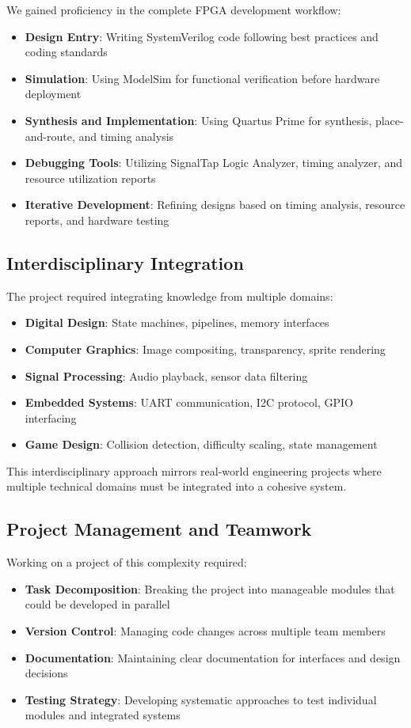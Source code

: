 \documentclass[12pt,a4paper]{article}
\begin{document}
We gained proficiency in the complete FPGA development workflow:
\begin{itemize}
    \item \textbf{Design Entry}: Writing SystemVerilog code following best practices and coding standards
    \item \textbf{Simulation}: Using ModelSim for functional verification before hardware deployment
    \item \textbf{Synthesis and Implementation}: Using Quartus Prime for synthesis, place-and-route, and timing analysis
    \item \textbf{Debugging Tools}: Utilizing SignalTap Logic Analyzer, timing analyzer, and resource utilization reports
    \item \textbf{Iterative Development}: Refining designs based on timing analysis, resource reports, and hardware testing
\end{itemize}

\subsection{Interdisciplinary Integration}

The project required integrating knowledge from multiple domains:
\begin{itemize}
    \item \textbf{Digital Design}: State machines, pipelines, memory interfaces
    \item \textbf{Computer Graphics}: Image compositing, transparency, sprite rendering
    \item \textbf{Signal Processing}: Audio playback, sensor data filtering
    \item \textbf{Embedded Systems}: UART communication, I2C protocol, GPIO interfacing
    \item \textbf{Game Design}: Collision detection, difficulty scaling, state management
\end{itemize}

This interdisciplinary approach mirrors real-world engineering projects where multiple technical domains must be integrated into a cohesive system.

\subsection{Project Management and Teamwork}

Working on a project of this complexity required:
\begin{itemize}
    \item \textbf{Task Decomposition}: Breaking the project into manageable modules that could be developed in parallel
    \item \textbf{Version Control}: Managing code changes across multiple team members
    \item \textbf{Documentation}: Maintaining clear documentation for interfaces and design decisions
    \item \textbf{Testing Strategy}: Developing systematic approaches to test individual modules and integrated systems
\end{itemize}
\end{document}
